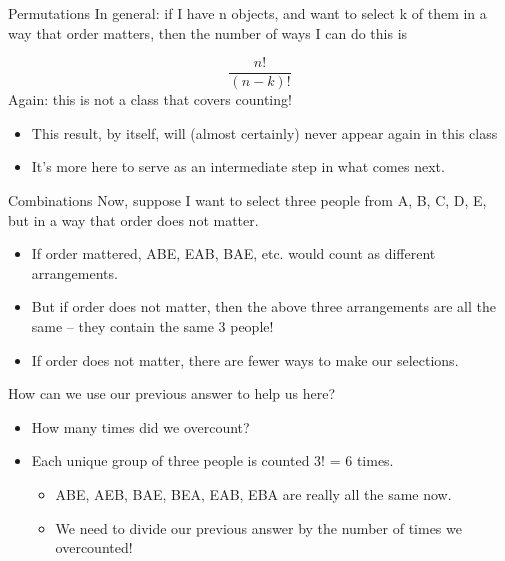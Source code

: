 \documentclass[aspectratio=169]{../latex_main/tntbeamer}  %
\begin{document}
	
	\begin{frame}{Permutations}
	    In general: if I have n objects, and want to select k of them in a way that order matters, then the number of ways I can do this is

	    \begin{equation*}
	        \frac{n!}{(n-k)!}
	    \end{equation*}
        Again: this is not a class that covers counting!
        \begin{itemize}
            \item This result, by itself, will (almost certainly) never appear again in this class
            \item It’s more here to serve as an intermediate step in what comes next.
        \end{itemize}

	\end{frame}
	
		\begin{frame}{Combinations}
	    Now, suppose I want to select three people from {A, B, C, D, E}, but in a way that order does not matter.

        \begin{itemize}
            \item If order mattered, ABE, EAB, BAE, etc. would count as different arrangements.
            \item But if order does not matter, then the above three arrangements are all the same – they contain the same 3 people!
            \item If order does not matter, there are fewer ways to make our selections. 
        \end{itemize}
        How can we use our previous answer to help us here?
        \begin{itemize}
            \item How many times did we overcount?
            \item Each unique group of three people is counted 3! = 6 times.
            \begin{itemize}
                \item ABE, AEB, BAE, BEA, EAB, EBA are really all the same now.
                \item We need to divide our previous answer by the number of times we overcounted!
            \end{itemize}
        \end{itemize}

	\end{frame}
	
\end{document}

